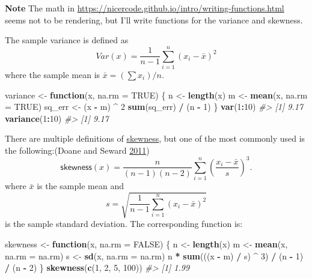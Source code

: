 \documentclass[]{book}
\newenvironment{Shaded}{\begin{snugshade}}{\end{snugshade}}
\newcommand{\CommentTok}[1]{\textcolor[rgb]{0.56,0.35,0.01}{\textit{#1}}}
\newcommand{\ControlFlowTok}[1]{\textcolor[rgb]{0.13,0.29,0.53}{\textbf{#1}}}
\newcommand{\DataTypeTok}[1]{\textcolor[rgb]{0.13,0.29,0.53}{#1}}
\newcommand{\DecValTok}[1]{\textcolor[rgb]{0.00,0.00,0.81}{#1}}
\newcommand{\KeywordTok}[1]{\textcolor[rgb]{0.13,0.29,0.53}{\textbf{#1}}}
\newcommand{\NormalTok}[1]{#1}
\newcommand{\OperatorTok}[1]{\textcolor[rgb]{0.81,0.36,0.00}{\textbf{#1}}}
\newcommand{\OtherTok}[1]{\textcolor[rgb]{0.56,0.35,0.01}{#1}}
\newcommand{\StringTok}[1]{\textcolor[rgb]{0.31,0.60,0.02}{#1}}
\theoremstyle{plain}
\theoremstyle{remark}
\theoremstyle{definition}
\theoremstyle{definition}
\theoremstyle{definition}
\theoremstyle{remark}
\begin{document}
\textbf{Note} The math in
\url{https://nicercode.github.io/intro/writing-functions.html} seems not
to be rendering, but I'll write functions for the variance and skewness.

The sample variance is defined as \[
Var(x) = \frac{1}{n - 1} \sum_{i=1}^n (x_i - \bar{x}) ^2
\] where the sample mean is \(\bar{x} = (\sum x_i) / n\).

\begin{Shaded}
\begin{Highlighting}[]
\NormalTok{variance <-}\StringTok{ }\ControlFlowTok{function}\NormalTok{(x, }\DataTypeTok{na.rm =} \OtherTok{TRUE}\NormalTok{) \{}
\NormalTok{  n <-}\StringTok{ }\KeywordTok{length}\NormalTok{(x)}
\NormalTok{  m <-}\StringTok{ }\KeywordTok{mean}\NormalTok{(x, }\DataTypeTok{na.rm =} \OtherTok{TRUE}\NormalTok{)}
\NormalTok{  sq_err <-}\StringTok{ }\NormalTok{(x }\OperatorTok{-}\StringTok{ }\NormalTok{m) }\OperatorTok{^}\StringTok{ }\DecValTok{2}
  \KeywordTok{sum}\NormalTok{(sq_err) }\OperatorTok{/}\StringTok{ }\NormalTok{(n }\OperatorTok{-}\StringTok{ }\DecValTok{1}\NormalTok{)}
\NormalTok{\}}
\KeywordTok{var}\NormalTok{(}\DecValTok{1}\OperatorTok{:}\DecValTok{10}\NormalTok{)}
\CommentTok{#> [1] 9.17}
\KeywordTok{variance}\NormalTok{(}\DecValTok{1}\OperatorTok{:}\DecValTok{10}\NormalTok{)}
\CommentTok{#> [1] 9.17}
\end{Highlighting}
\end{Shaded}

There are multiple definitions of
\href{https://en.wikipedia.org/wiki/Skewness}{skewness}, but one of the
most commonly used is the following:(Doane and Seward
\protect\hyperlink{ref-DoaneSeward2011}{2011}) \[
\mathsf{skewness}(x) = \frac{n}{(n - 1)(n - 2)} \sum_{i = 1}^{n} {\left( \frac{x_i - \bar{x}}{s} \right)}^{3} .
\] where \(\bar{x}\) is the sample mean and \[
s = \sqrt{\frac{1}{n - 1} \sum_{i = 1}^{n} (x_i - \bar{x})^2}
\] is the sample standard deviation. The corresponding function is:

\begin{Shaded}
\begin{Highlighting}[]
\NormalTok{skewness <-}\StringTok{ }\ControlFlowTok{function}\NormalTok{(x, }\DataTypeTok{na.rm =} \OtherTok{FALSE}\NormalTok{) \{}
\NormalTok{  n <-}\StringTok{ }\KeywordTok{length}\NormalTok{(x)}
\NormalTok{  m <-}\StringTok{ }\KeywordTok{mean}\NormalTok{(x, }\DataTypeTok{na.rm =}\NormalTok{ na.rm)}
\NormalTok{  s <-}\StringTok{ }\KeywordTok{sd}\NormalTok{(x, }\DataTypeTok{na.rm =}\NormalTok{ na.rm)}
\NormalTok{  n }\OperatorTok{*}\StringTok{ }\KeywordTok{sum}\NormalTok{(((x }\OperatorTok{-}\StringTok{ }\NormalTok{m) }\OperatorTok{/}\StringTok{ }\NormalTok{s) }\OperatorTok{^}\StringTok{ }\DecValTok{3}\NormalTok{) }\OperatorTok{/}\StringTok{ }\NormalTok{(n }\OperatorTok{-}\StringTok{ }\DecValTok{1}\NormalTok{) }\OperatorTok{/}\StringTok{ }\NormalTok{(n }\OperatorTok{-}\StringTok{ }\DecValTok{2}\NormalTok{)}
\NormalTok{\}}
\KeywordTok{skewness}\NormalTok{(}\KeywordTok{c}\NormalTok{(}\DecValTok{1}\NormalTok{, }\DecValTok{2}\NormalTok{, }\DecValTok{5}\NormalTok{, }\DecValTok{100}\NormalTok{))}
\CommentTok{#> [1] 1.99}
\end{Highlighting}
\end{Shaded}
\end{document}
